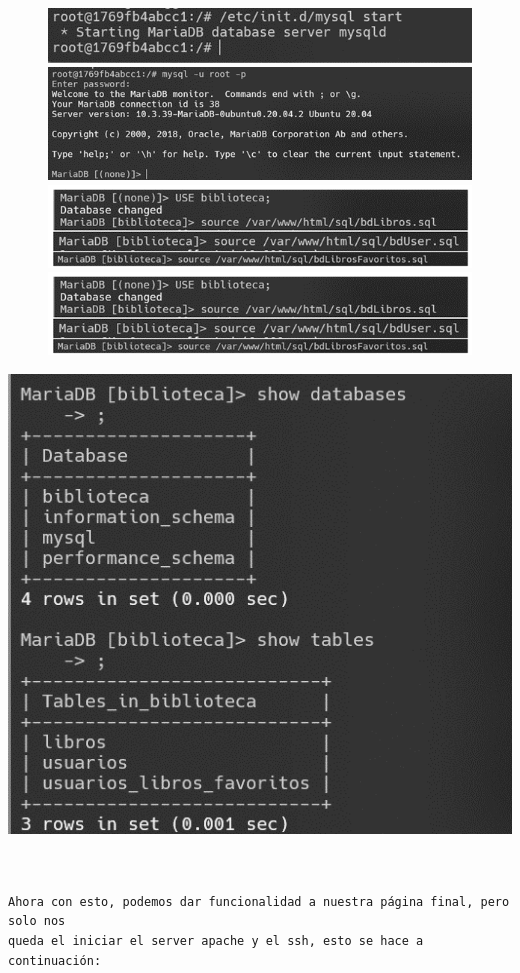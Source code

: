 \documentclass{article}
\begin{document}
\begin{figure}[h]
    \centering
    \includegraphics[width=1\textwidth]{img/11.png}
    \includegraphics[width=1\textwidth]{img/12.png}
    \includegraphics[width=1\textwidth]{img/13.png}
    \includegraphics[width=1\textwidth]{img/13.png}    
    \label{fig:imagen}
\end{figure}


\begin{flushleft}
    \includegraphics[width=1\textwidth]{img/14.png}
\begin{verbatim}


Ahora con esto, podemos dar funcionalidad a nuestra página final, pero solo nos 
queda el iniciar el server apache y el ssh, esto se hace a continuación:
\end{verbatim}
\end{flushleft}
\end{document}
